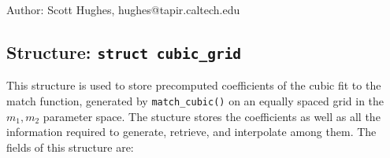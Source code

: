 \begin{description}
\item{Author:} Scott Hughes, hughes@tapir.caltech.edu
\end{description}





\clearpage
\subsection{Structure: {\tt struct cubic\_grid}}
\label{ss:cubic_grid}

This structure is used to store precomputed coefficients of the cubic
fit to the match function, generated by {\tt match\_cubic()} on an
equally spaced grid in the $m_1,m_2$ parameter space.  The stucture
stores the coefficients as well as all the information required to
generate, retrieve, and interpolate among them.  The fields of this
structure are:

